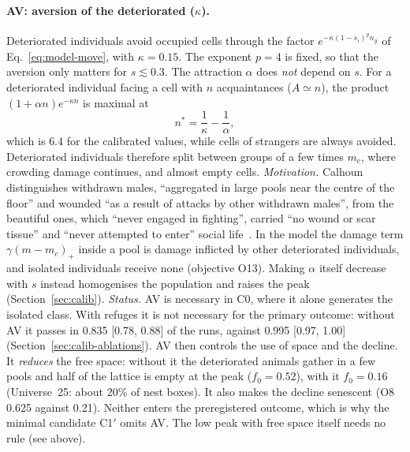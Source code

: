 \paragraph{AV: aversion of the deteriorated ($\kappa$).}
Deteriorated individuals avoid occupied cells through the factor $e^{-\kappa(1-s_i)^{p}n_y}$ of
Eq.~\eqref{eq:model-move}, with $\kappa=0.15$. The exponent $p=4$ is fixed, so that the aversion only
matters for $s\lesssim0.3$. The attraction $\alpha$ does \emph{not} depend on $s$. For a deteriorated
individual facing a cell with $n$ acquaintances ($A\simeq n$), the product $(1+\alpha n)e^{-\kappa n}$ is
maximal at
\begin{equation}
  n^*=\frac{1}{\kappa}-\frac{1}{\alpha},
  \label{eq:model-nstar}
\end{equation}
which is $6.4$ for the calibrated values, while cells of strangers are always avoided. Deteriorated
individuals therefore split between groups of a few times $m_c$, where crowding damage continues, and
almost empty cells.
\emph{Motivation.} Calhoun distinguishes withdrawn males, ``aggregated in large pools near the centre of
the floor'' and wounded ``as a result of attacks by other withdrawn males'', from the beautiful ones,
which ``never engaged in fighting'', carried ``no wound or scar tissue'' and ``never attempted to
enter'' social life~\cite{Calhoun1973}. In the model the damage term $\gamma(m-m_c)_+$ inside a pool is
damage inflicted by other deteriorated individuals, and isolated individuals receive none (objective
O13). Making $\alpha$ itself decrease with $s$ instead homogenises the population and raises the peak
(Section~\ref{sec:calib}).
\emph{Status.} AV is necessary in \textsf{C0}, where it alone generates the isolated class. With refuges it
is not necessary for the primary outcome: without AV it passes in 0.835 [0.78, 0.88] of the runs, against
0.995 [0.97, 1.00] (Section~\ref{sec:calib-ablations}). AV then controls the use of space and the decline. It
\emph{reduces} the free space: without it the deteriorated animals gather in a few pools and half of the lattice is
empty at the peak ($f_0=0.52$), with it $f_0=0.16$ (Universe~25: about 20\% of nest boxes). It also makes the
decline senescent (O8 0.625 against 0.21). Neither enters the preregistered outcome, which is why the minimal
candidate \textsf{C1$'$} omits AV. The low peak with free space itself needs no rule (see above).


